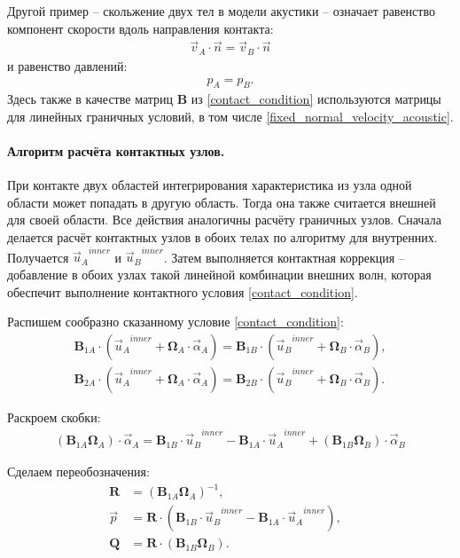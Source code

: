 \documentclass[a4paper]{article}
\numberwithin{equation}{section}
\begin{document}
Другой пример -- скольжение двух тел в модели акустики -- 
означает равенство компонент скорости вдоль направления контакта:
\begin{eqnarray}
\vec{v}_A \cdot \vec{n} = \vec{v}_B \cdot \vec{n}
\end{eqnarray}
и равенство давлений:
\begin{eqnarray}
p_A = p_B.
\end{eqnarray}
Здесь также в качестве матриц $\mathbf{B}$ из \eqref{contact_condition} 
используются матрицы для линейных граничных условий, в том числе 
\eqref{fixed_normal_velocity_acoustic}.


\paragraph{Алгоритм расчёта контактных узлов.}
\label{sec:good-contact-case}
При контакте двух областей интегрирования характеристика из узла
одной области может попадать в другую область. Тогда она также считается
внешней для своей области. 
Все действия аналогичны расчёту граничных узлов. 
Сначала делается расчёт контактных узлов в обоих телах по алгоритму для внутренних.
Получается ${\vec{u}_A}^{inner}$ и ${\vec{u}_B}^{inner}$. 
Затем выполняется контактная коррекция -- 
добавление в обоих узлах такой линейной комбинации внешних волн, 
которая обеспечит выполнение контактного условия \eqref{contact_condition}. 

Распишем сообразно сказанному условие \eqref{contact_condition}:
\begin{eqnarray}
	\mathbf{B}_{1A} \cdot ({\vec{u}_A}^{inner} + \mathbf{\Omega}_A \cdot \vec{\alpha}_A) = \mathbf{B}_{1B} \cdot ({\vec{u}_B}^{inner} + \mathbf{\Omega}_B \cdot \vec{\alpha}_B), \\
\label{second_line_in_contact_condition_wide}
	\mathbf{B}_{2A} \cdot ({\vec{u}_A}^{inner} + \mathbf{\Omega}_A \cdot \vec{\alpha}_A) = \mathbf{B}_{2B} \cdot ({\vec{u}_B}^{inner} + \mathbf{\Omega}_B \cdot \vec{\alpha}_B).
\end{eqnarray}

Раскроем скобки:
\begin{eqnarray}
	(\mathbf{B}_{1A} \mathbf{\Omega}_A) \cdot  \vec{\alpha}_A = \mathbf{B}_{1B} \cdot {\vec{u}_B}^{inner} - \mathbf{B}_{1A} \cdot {\vec{u}_A}^{inner} + (\mathbf{B}_{1B} \mathbf{\Omega}_B) \cdot \vec{\alpha}_B
\end{eqnarray}

Сделаем переобозначения:
\begin{align}
\label{matrixRcontact}
\mathbf{R} &= (\mathbf{B}_{1A} \mathbf{\Omega}_A)^{-1}, &\\
\vec{p} &= \mathbf{R} \cdot (\mathbf{B}_{1B} \cdot {\vec{u}_B}^{inner} - \mathbf{B}_{1A} \cdot {\vec{u}_A}^{inner}), &\\
\mathbf{Q} &= \mathbf{R} \cdot (\mathbf{B}_{1B} \mathbf{\Omega}_B).
\end{align}
\end{document}
